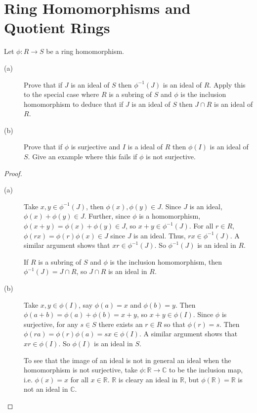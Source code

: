 \documentclass[12pt,leqno]{book}
\numberwithin{equation}{section}
\newcommand{\question}[2] {\vspace{.25in}\noindent\fbox{#1} #2 \vspace{.10in}}
\theoremstyle{definition}
\begin{document}
\section{Ring Homomorphisms and Quotient Rings}
\question{24}{Let $\phi:R\to S$ be a ring homomorphism.}
\begin{description}
 \item [(a)] Prove that if $J$ is an ideal of $S$ then $\phi^{-1}(J)$ is an ideal of $R$. Apply this to the special case where $R$ is a subring of $S$ and $\phi$ is the inclusion homomorphism to deduce that if $J$ is an ideal of $S$ then $J\cap R$ is an ideal of $R$.
 \item [(b)] Prove that if $\phi$ is surjective and $I$ is a ideal of $R$ then $\phi(I)$ is an ideal of $S$. Give an example where this fails if $\phi$ is not surjective.
\end{description}

\begin{proof}\indent
 \begin{description}
  \item [(a)] Take $x,y\in\phi^{-1}(J)$, then $\phi(x),\phi(y)\in J$. Since $J$ is an ideal, $\phi(x)+\phi(y)\in J$. Further, since $\phi$ is a homomorphism, $\phi(x+y)=\phi(x)+\phi(y)\in J$, so $x+y\in\phi^{-1}(J)$. For all $r\in R$, $\phi(rx)=\phi(r)\phi(x)\in J$ since $J$ is an ideal. Thus, $rx\in\phi^{-1}(J)$. A similar argument shows that $xr\in\phi^{-1}(J)$. So $\phi^{-1}(J)$ is an ideal in $R$.

If $R$ is a subring of $S$ and $\phi$ is the inclusion homomorphism, then $\phi^{-1}(J)=J\cap R$, so $J\cap R$ is an ideal in $R$.
  \item [(b)] Take $x,y\in\phi(I)$, say $\phi(a)=x$ and $\phi(b)=y$. Then $\phi(a+b)=\phi(a)+\phi(b)=x+y$, so $x+y\in\phi(I)$. Since $\phi$ is surjective, for any $s\in S$ there exists an $r\in R$ so that $\phi(r)=s$. Then $\phi(ra)=\phi(r)\phi(a)=sx\in\phi(I)$. A similar argument shows that $xr\in\phi(I)$. So $\phi(I)$ is an ideal in $S$.

To see that the image of an ideal is not in general an ideal when the homomorphism is not surjective, take $\phi:\mathbb{R}\to\mathbb{C}$ to be the inclusion map, i.e. $\phi(x)=x$ for all $x\in\mathbb{R}$. $\mathbb{R}$ is cleary an ideal in $\mathbb{R}$, but $\phi(\mathbb{R})=\mathbb{R}$ is not an ideal in $\mathbb{C}$.\qedhere
 \end{description}

\end{proof}
\end{document}
